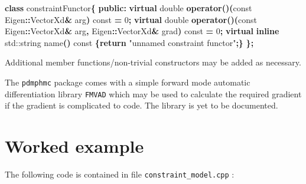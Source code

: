 \documentclass[
]{book}
\newenvironment{Shaded}{\begin{snugshade}}{\end{snugshade}}
\newcommand{\AttributeTok}[1]{\textcolor[rgb]{0.77,0.63,0.00}{#1}}
\newcommand{\BuiltInTok}[1]{#1}
\newcommand{\ControlFlowTok}[1]{\textcolor[rgb]{0.13,0.29,0.53}{\textbf{#1}}}
\newcommand{\DataTypeTok}[1]{\textcolor[rgb]{0.13,0.29,0.53}{#1}}
\newcommand{\DecValTok}[1]{\textcolor[rgb]{0.00,0.00,0.81}{#1}}
\newcommand{\KeywordTok}[1]{\textcolor[rgb]{0.13,0.29,0.53}{\textbf{#1}}}
\newcommand{\NormalTok}[1]{#1}
\newcommand{\OperatorTok}[1]{\textcolor[rgb]{0.81,0.36,0.00}{\textbf{#1}}}
\newcommand{\StringTok}[1]{\textcolor[rgb]{0.31,0.60,0.02}{#1}}
\begin{document}
\begin{Shaded}
\begin{Highlighting}[]
\KeywordTok{class}\NormalTok{ constraintFunctor}\OperatorTok{\{}
\KeywordTok{public}\OperatorTok{:}
  \KeywordTok{virtual} \DataTypeTok{double} \KeywordTok{operator}\OperatorTok{()(}\AttributeTok{const}\NormalTok{ Eigen}\OperatorTok{::}\NormalTok{VectorXd}\OperatorTok{\&}\NormalTok{ arg}\OperatorTok{)} \AttributeTok{const} \OperatorTok{=} \DecValTok{0}\OperatorTok{;}
  \KeywordTok{virtual} \DataTypeTok{double} \KeywordTok{operator}\OperatorTok{()(}\AttributeTok{const}\NormalTok{ Eigen}\OperatorTok{::}\NormalTok{VectorXd}\OperatorTok{\&}\NormalTok{ arg}\OperatorTok{,}
\NormalTok{                          Eigen}\OperatorTok{::}\NormalTok{VectorXd}\OperatorTok{\&}\NormalTok{ grad}\OperatorTok{)} \AttributeTok{const}  \OperatorTok{=} \DecValTok{0}\OperatorTok{;}
  \KeywordTok{virtual} \KeywordTok{inline} \BuiltInTok{std::}\NormalTok{string}\OperatorTok{ }\NormalTok{name}\OperatorTok{()} \AttributeTok{const} \OperatorTok{\{}\ControlFlowTok{return} \StringTok{"unnamed constraint functor"}\OperatorTok{;\}}
\OperatorTok{\};}
\end{Highlighting}
\end{Shaded}

Additional member functions/non-trivial constructors may be added as necessary.

The \texttt{pdmphmc} package comes with a simple forward mode automatic differentiation library \texttt{FMVAD} which may be used to calculate the required gradient if the gradient is complicated to code. The library is yet to be documented.

\hypertarget{worked-example}{%
\section{Worked example}\label{worked-example}}

The following code is contained in file \texttt{constraint\_model.cpp} :
\end{document}
